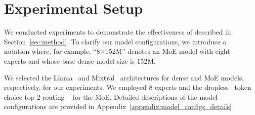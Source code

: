 \section{Experimental Setup}

We conducted experiments to demonstrate the effectiveness of \methodname{} described in Section~\ref{sec:method}.
To clarify our model configurations, we introduce a notation where, for example, ``8×152M'' denotes an MoE model with eight experts and whose base dense model size is 152M.


\label{sec:model-architecture}


We selected the Llama~\citep{touvron2023llamaopenefficientfoundation} and Mixtral~\citep{jiang2024mixtralexperts} architectures for dense and MoE models, respectively, for our experiments. 
%
We employed 8 experts and the dropless~\citep{megablocks} token choice top-2 routing ~\citep{shazeer2017} for the MoE.
Detailed descriptions of the model configurations are provided in Appendix~\ref{appendix:model_configs_details}



